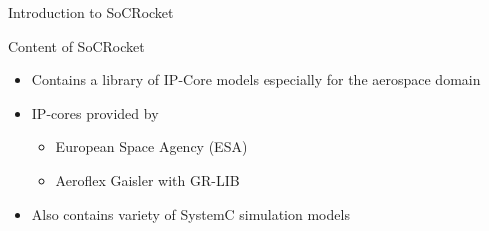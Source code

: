 \begin{frame}{Introduction to SoCRocket}
\begin{block}{Content of SoCRocket}
  \begin{itemize}
		\item Contains a library of IP-Core models especially for the aerospace domain
		\item IP-cores provided by 
			\begin{itemize}
				\item European Space Agency (ESA)
				\item Aeroflex Gaisler with GR-LIB
			\end{itemize}
		\item Also contains variety of SystemC simulation models
	\end{itemize}
\end{block}
\end{frame}